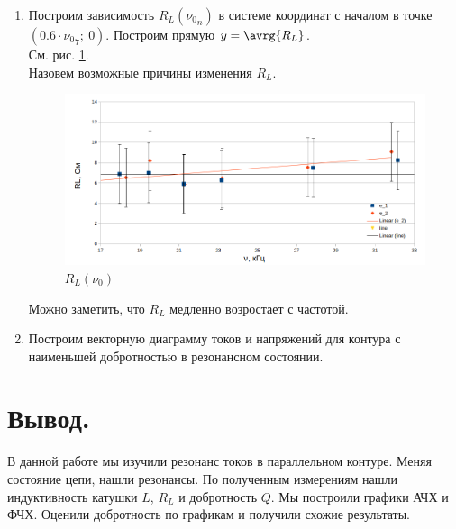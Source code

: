 \documentclass{report}
\begin{document}
\begin{enumerate}
	\item Построим зависимость $ R_L({\nu_{0}}_n) $ в системе координат с началом в
	      точке $ (0.6\cdot {\nu_0}_7;\ 0) $. Построим прямую $ y = \avrg{R_L} $.\\
	      См. рис. \ref{fig:RL}.\\
	      Назовем возможные причины изменения $ R_L $.
	      \begin{figure}[H]
		      \centering
		      \def\svgwidth{\columnwidth}
		      \includegraphics[scale = 0.5]{figures/RL.png}
		      \caption{ $ R_L(\nu_0) $ }
		      \label{fig:RL}
	      \end{figure}

	      Можно заметить, что $ R_L $ медленно возростает с частотой.\\

	\item Построим векторную диаграмму токов и напряжений для контура с
	      наименьшей добротностью в резонансном состоянии.\\


\end{enumerate}

\section{Вывод.}

В данной работе мы изучили резонанс токов в параллельном контуре.
Меняя состояние цепи, нашли резонансы. По полученным измерениям нашли
индуктивность катушки $ L $, $ R_L $ и добротность $ Q $.
Мы построили графики АЧХ и ФЧХ. Оценили добротность по графикам и получили схожие результаты.
\end{document}
